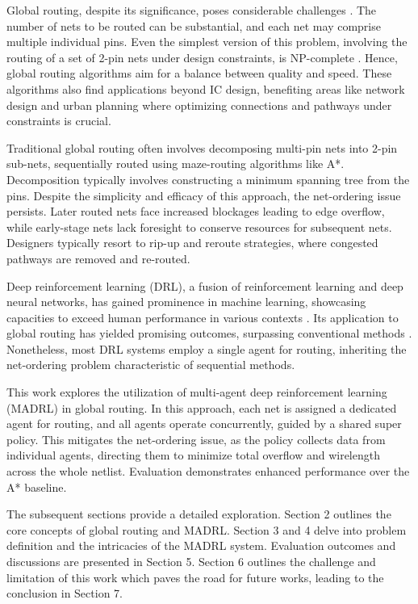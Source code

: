 \documentclass[conference]{IEEEtran}
\begin{document}
Global routing, despite its significance, poses considerable challenges \cite{Liao2020}. The number of nets to be routed can be substantial, and each net may comprise multiple individual pins. Even the simplest version of this problem, involving the routing of a set of 2-pin nets under design constraints, is NP-complete \cite{Kramer1984}. Hence, global routing algorithms aim for a balance between quality and speed. These algorithms also find applications beyond IC design, benefiting areas like network design \cite{Fortz2000} and urban planning \cite{Fragiadakis2015} where optimizing connections and pathways under constraints is crucial.

Traditional global routing often involves decomposing multi-pin nets into 2-pin sub-nets, sequentially routed using maze-routing algorithms like A*. Decomposition typically involves constructing a minimum spanning tree from the pins. Despite the simplicity and efficacy of this approach, the net-ordering issue persists. Later routed nets face increased blockages leading to edge overflow, while early-stage nets lack foresight to conserve resources for subsequent nets. Designers typically resort to rip-up and reroute strategies, where congested pathways are removed and re-routed.

Deep reinforcement learning (DRL), a fusion of reinforcement learning and deep neural networks, has gained prominence in machine learning, showcasing capacities to exceed human performance in various contexts \cite{Mnih2013}. Its application to global routing has yielded promising outcomes, surpassing conventional methods \cite{Liao2020,Xu2023}. Nonetheless, most DRL systems employ a single agent for routing, inheriting the net-ordering problem characteristic of sequential methods.

This work explores the utilization of multi-agent deep reinforcement learning (MADRL) in global routing. In this approach, each net is assigned a dedicated agent for routing, and all agents operate concurrently, guided by a shared super policy. This mitigates the net-ordering issue, as the policy collects data from individual agents, directing them to minimize total overflow and wirelength across the whole netlist. Evaluation demonstrates enhanced performance over the A* baseline.

The subsequent sections provide a detailed exploration. Section 2 outlines the core concepts of global routing and MADRL. Section 3 and 4 delve into problem definition and the intricacies of the MADRL system. Evaluation outcomes and discussions are presented in Section 5. Section 6 outlines the challenge and limitation of this work which paves the road for future works, leading to the conclusion in Section 7.
\end{document}
